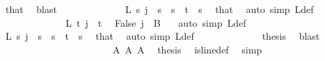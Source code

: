 \begin{isabellebody}
\ that\ \isamarkupfalse%
\ blast\isanewline
\ \ \ \ \ \ \ \ \ \ \isamarkupfalse%
\ \isamarkupfalse%
\ {\isachardoublequoteopen}L{\isacharprime}{\kern0pt}\ s\ j\ {\isacharequal}{\kern0pt}\ s{\isachardoublequoteclose}\ \ {\isachardoublequoteopen}s\ {\isacharless}{\kern0pt}\ t{\isachardoublequoteclose}\ \ s\ \isamarkupfalse%
\ that\ \isamarkupfalse%
\ {\isacharparenleft}{\kern0pt}auto\ simp{\isacharcolon}{\kern0pt}\ L{\isacharprime}{\kern0pt}{\isacharunderscore}{\kern0pt}def{\isacharparenright}{\kern0pt}\isanewline
\ \ \ \ \ \ \ \ \ \ \isamarkupfalse%
\ \isamarkupfalse%
\ {\isachardoublequoteopen}L{\isacharprime}{\kern0pt}\ t\ j\ {\isacharequal}{\kern0pt}\ t{\isachardoublequoteclose}\ \isamarkupfalse%
\ False\ {\isacartoucheopen}j\ {\isasymin}\ B\ {}{\isacartoucheclose}\ \isamarkupfalse%
\ {\isacharparenleft}{\kern0pt}auto\ simp{\isacharcolon}{\kern0pt}\ L{\isacharprime}{\kern0pt}{\isacharunderscore}{\kern0pt}def{\isacharparenright}{\kern0pt}\isanewline
\ \ \ \ \ \ \ \ \ \ \isamarkupfalse%
\ \isamarkupfalse%
\ {\isachardoublequoteopen}L{\isacharprime}{\kern0pt}\ s\ j\ {\isacharequal}{\kern0pt}\ s{\isachardoublequoteclose}\ \ {\isachardoublequoteopen}s\ {\isacharless}{\kern0pt}\ t{\isacharplus}{\kern0pt}{}{\isachardoublequoteclose}\ \ s\ \isamarkupfalse%
\ that\ \isamarkupfalse%
\ {\isacharparenleft}{\kern0pt}auto\ simp{\isacharcolon}{\kern0pt}\ L{\isacharprime}{\kern0pt}{\isacharunderscore}{\kern0pt}def{\isacharparenright}{\kern0pt}\isanewline
\ \ \ \ \ \ \ \ \ \ \isamarkupfalse%
\ \isamarkupfalse%
\ {\isacharquery}{\kern0pt}thesis\ \isamarkupfalse%
\ blast\isanewline
\ \ \ \ \ \ \ \ \isamarkupfalse%
\isanewline
\isanewline
\isanewline
\isanewline
\isanewline
\ \ \ \ \ \ \isamarkupfalse%
\isanewline
\ \ \ \ \ \ \isamarkupfalse%
\ A{}\ A{}\ A{}\ \isamarkupfalse%
\ {\isacharquery}{\kern0pt}thesis\ \isamarkupfalse%
\ is{\isacharunderscore}{\kern0pt}line{\isacharunderscore}{\kern0pt}def\ \isamarkupfalse%
\ simp\isanewline
\isanewline
\isanewline
\ \ \ \ \isamarkupfalse%
\isanewline
\ \ \ \ \isamarkupfalse%
\ \isamarkupfalse%

\end{isabellebody}
